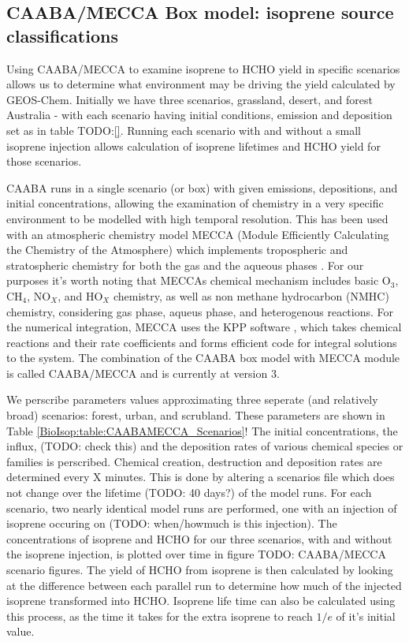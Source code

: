   
  \subsection{CAABA/MECCA Box model: isoprene source classifications}
    \label{BioIsop:Methods:CM}
    
    Using CAABA/MECCA to examine isoprene to HCHO yield in specific scenarios allows us to determine what environment may be driving the yield calculated by GEOS-Chem.
    Initially we have three scenarios, grassland, desert, and forest Australia - with each scenario having initial conditions, emission and deposition set as in table TODO:\ref{}.
    Running each scenario with and without a small isoprene injection allows calculation of isoprene lifetimes and HCHO yield for those scenarios.
    
    CAABA runs in a single scenario (or box) with given emissions, depositions, and initial concentrations, allowing the examination of chemistry in a very specific environment to be modelled with high temporal resolution.
    This has been used with an atmospheric chemistry model MECCA (Module Efficiently Calculating the Chemistry of the Atmosphere) which implements tropospheric and stratospheric chemistry for both the gas and the aqueous phases \citep{Sander2005}.
    For our purposes it's worth noting that MECCAs chemical mechanism includes basic O$_3$, CH$_4$, NO$_X$, and HO$_X$ chemistry, as well as non methane hydrocarbon (NMHC) chemistry, considering gas phase, aqueus phase, and heterogenous reactions. \citep{Sander2005}
    For the numerical integration, MECCA uses the KPP software \citep{SanduSander2006}, which takes chemical reactions and their rate coefficients and forms efficient code for integral solutions to the system.
    The combination of the CAABA box model with MECCA module is called CAABA/MECCA and is currently at version 3.
    
    
    We perscribe parameters values approximating three seperate (and relatively broad) scenarios: forest, urban, and scrubland.
    These parameters are shown in Table \ref{BioIsop:table:CAABAMECCA_Scenarios}!
    The initial concentrations, the influx, (TODO: check this) and the deposition rates of various chemical species or families is perscribed.
    Chemical creation, destruction and deposition rates are determined every X minutes.
    This is done by altering a scenarios file which does not change over the lifetime (TODO: 40 days?) of the model runs.
    For each scenario, two nearly identical model runs are performed, one with an injection of isoprene occuring on (TODO: when/howmuch is this injection).
    The concentrations of isoprene and HCHO for our three scenarios, with and without the isoprene injection, is plotted over time in figure TODO: CAABA/MECCA scenario figures.
    The yield of HCHO from isoprene is then calculated by looking at the difference between each parallel run to determine how much of the injected isoprene transformed into HCHO.
    Isoprene life time can also be calculated using this process, as the time it takes for the extra isoprene to reach $1/e$ of it's initial value.
    
